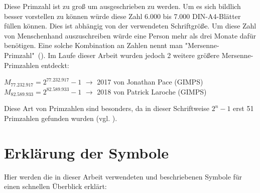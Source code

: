 \documentclass[12pt,a4paper]{article}
\theoremstyle{definition}
\begin{document}
Diese Primzahl ist zu groß um ausgeschrieben zu werden.
Um es sich bildlich besser vorstellen zu können würde diese Zahl 6.000 bis 7.000 DIN-A4-Blätter füllen können.
Dies ist abhängig von der verwendeten Schriftgröße.
Um diese Zahl von Menschenhand auszuschreiben würde eine Person mehr als drei Monate dafür benötigen.
Eine solche Kombination an Zahlen nennt man "Mersenne-Primzahl"\ (\cite{TheNewYorkTimes2016}).
Im Laufe dieser Arbeit wurden jedoch 2 weitere größere Mersenne-Primzahlen entdeckt:
\begin{center}
$M_{77.232.917} = 2^{77.232.917}-1$ $\rightarrow$ 2017 von Jonathan Pace (GIMPS)\\
$M_{82.589.933} = 2^{82.589.933}-1$ $\rightarrow$ 2018 von Patrick Laroche (GIMPS)
\end{center}

Diese Art von Primzahlen sind besonders, da in dieser Schriftweise $2^n-1$ erst 51 Primzahlen gefunden wurden (vgl. \cite{ListederMersennePrimzahlen2020}).
\newpage

\tableofcontents
\thispagestyle{empty}
\newpage

\section*{Erklärung der Symbole}
Hier werden die in dieser Arbeit verwendeten und beschriebenen Symbole für einen schnellen Überblick erklärt:
\end{document}
